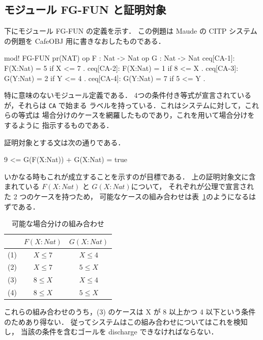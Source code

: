 \documentclass[a4paper,oneside,10pt,here]{memoir}
\newenvironment{vvtm}%
{\parskip=0pt\lineskip=0pt\begin{center}\begin{minipage}{0.8\textwidth}\begin{snugshade}}%
  {\end{snugshade}\end{minipage}\end{center}}
\begin{document}
\subsection{モジュール FG-FUN と証明対象}

下にモジュール FG-FUN の定義を示す．
この例題は Maude の CITP システムの例題を CafeOBJ 用に書きなおしたものである．

\begin{vvtm}
  \begin{simplev}
mod! FG-FUN {
  pr(NAT)
  op F : Nat -> Nat 
  op G : Nat -> Nat
  ceq[CA-1]: F(X:Nat) = 5 if X <= 7 .
  ceq[CA-2]: F(X:Nat) = 1 if 8 <= X .
  ceq[CA-3]: G(Y:Nat) = 2 if Y <= 4 .
  ceq[CA-4]: G(Y:Nat) = 7 if 5 <= Y .
}
  \end{simplev}
\end{vvtm}

特に意味のないモジュール定義である．
4つの条件付き等式が宣言されているが，それらは \texttt{CA} で始まる
ラベルを持っている．これはシステムに対して，これらの等式は
場合分けのケースを網羅したものであり，これを用いて場合分けをするように
指示するものである．

証明対象とする文は次の通りである．
\begin{vvtm}
  \begin{simplev}
9 <= G(F(X:Nat)) + G(X:Nat) = true
  \end{simplev}
\end{vvtm}
いかなる時もこれが成立することを示すのが目標である．
上の証明対象文に含まれている $F(X:Nat)$ と $G(X:Nat)$について， 
それぞれが公理で宣言された 2 つのケースを持つため，
可能なケースの組み合わせは表~\ref{tab:cases}のようになるはずである．
\begin{table}
\label{tab:cases}
\caption{可能な場合分けの組み合わせ}
\begin{center}
\begin{tabular}[htb]{|c|c|c|}\hline
&$F(X:Nat)$ & $G(X:Nat)$ \\\hline
(1)&$X \le 7$ & $X \le 4$ \\
(2)&$X \le 7$ & $5 \le X$ \\
(3)&$8 \le X$ & $X \le 4$ \\
(4)&$8 \le X$ & $5 \le X$ \\\hline 
\end{tabular}
\end{center}
\end{table}

これらの組み合わせのうち，(3) のケースは
X が 8 以上かつ 4 以下という条件のためあり得ない．
従ってシステムはこの組み合わせについてはこれを検知し，
当該の条件を含むゴールを discharge できなければならない．
\end{document}

